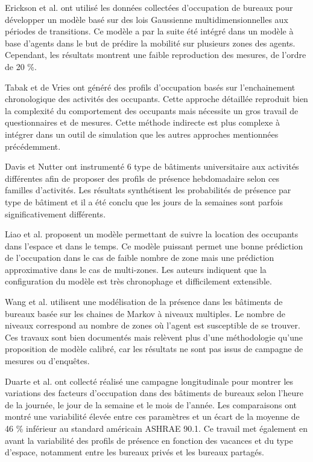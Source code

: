 Erickson et al. \cite{Erickson-09} ont utilisé les données collectées d'occupation de bureaux pour développer un modèle basé sur des lois Gaussienne multidimensionnelles aux périodes de transitions. Ce modèle a par la suite été intégré dans un modèle à base d'agents dans le but de prédire la mobilité sur plusieurs zones des agents. Cependant, les résultats montrent une faible reproduction des mesures, de l'ordre de 20 \%.

Tabak et de Vries \cite{Tabak-10} ont généré des profils d'occupation basés sur l'enchainement chronologique des activités des occupants. Cette approche détaillée reproduit bien la complexité du comportement des occupants mais nécessite un gros travail de questionnaires et de mesures. Cette méthode indirecte est plus complexe à intégrer dans un outil de simulation que les autres approches mentionnées précédemment.

Davis et Nutter \cite{Davis-10} ont instrumenté 6 type de bâtiments universitaire aux activités différentes afin de proposer des profils de présence hebdomadaire selon ces familles d'activités. Les résultats synthétisent les probabilités de présence par type de bâtiment et il a été conclu que les jours de la semaines sont parfois significativement différents.

Liao et al. \cite{Liao-11} proposent un modèle permettant de suivre la location des occupants dans l'espace et dans le temps. Ce modèle puissant permet une bonne prédiction de l'occupation dans le cas de faible nombre de zone mais une prédiction approximative dans le cas de multi-zones. Les auteurs indiquent que la configuration du modèle est très chronophage et difficilement extensible.

Wang et al. \cite{Wang-11} utilisent une modélisation de la présence dans les bâtiments de bureaux basée sur les chaines de Markov à niveaux multiples. Le nombre de niveaux correspond au nombre de zones où l'agent est susceptible de se trouver. Ces travaux sont bien documentés mais relèvent plus d'une méthodologie qu'une proposition de modèle calibré, car les résultats ne sont pas issus de campagne de mesures ou d'enquêtes.

Duarte et al. \cite{Duarte-13} ont collecté réalisé une campagne longitudinale pour montrer les variations des facteurs d'occupation dans des bâtiments de bureaux selon l'heure de la journée, le jour de la semaine et le mois de l'année. Les comparaisons ont montré une variabilité élevée entre ces paramètres et un écart de la moyenne de 46 \% inférieur au standard américain ASHRAE 90.1. Ce travail met également en avant la variabilité des profils de présence en fonction des vacances et du type d'espace, notamment entre les bureaux privés et les bureaux partagés.

